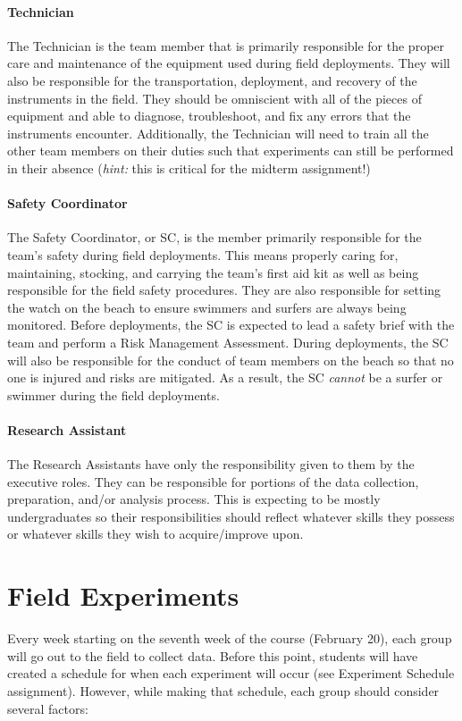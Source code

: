 \documentclass[
	letterpaper, %
	fontsize=10pt, %
	twoside=true, %
	numbers=noenddot, %
]{kaobook}
\begin{document}
\paragraph*{Technician} The Technician is the team member that is primarily responsible for the proper care and maintenance of the equipment used during field deployments.
They will also be responsible for the transportation, deployment, and recovery of the instruments in the field.
They should be omniscient with all of the pieces of equipment and able to diagnose, troubleshoot, and fix any errors that the instruments encounter.
Additionally, the Technician will need to train all the other team members on their duties such that experiments can still be performed in their absence (\emph{hint:} this is critical for the midterm assignment!)

\paragraph*{Safety Coordinator} The Safety Coordinator, or SC, is the member primarily responsible for the team's safety during field deployments.
This means properly caring for, maintaining, stocking, and carrying the team's first aid kit as well as being responsible for the field safety procedures.
They are also responsible for setting the watch on the beach to ensure swimmers and surfers are always being monitored.
Before deployments, the SC is expected to lead a safety brief with the team and perform a Risk Management Assessment.
During deployments, the SC will also be responsible for the conduct of team members on the beach so that no one is injured and risks are mitigated.
As a result, the SC \emph{cannot} be a surfer or swimmer during the field deployments.

\paragraph*{Research Assistant} The Research Assistants have only the responsibility given to them by the executive roles.
They can be responsible for portions of the data collection, preparation, and/or analysis process.
This is expecting to be mostly undergraduates so their responsibilities should reflect whatever skills they possess or whatever skills they wish to acquire/improve upon.

\section*{Field Experiments} 
Every week starting on the seventh week of the course (February 20), each group will go out to the field to collect data.
Before this point, students will have created a schedule for when each experiment will occur (see Experiment Schedule assignment).
However, while making that schedule, each group should consider several factors:
\end{document}
